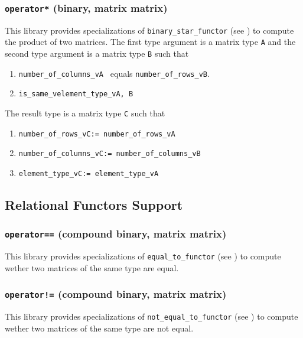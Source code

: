 \documentclass[oneside]{book}
\begin{document}
\subsubsection{\texttt{operator*} (binary, matrix matrix)}
This library provides specializations of
\texttt{binary\_star\_functor}
(see \cite{arithmeticfunctors}) to compute the
product
of two matrices. The first type argument is a matrix type \texttt{A} and the second type argument is a matrix type \texttt{B}
such that
\begin{enumerate}
	\item \texttt{number\_of\_columns\_v\textlangle A \textrangle} equals \texttt{number\_of\_rows\_v\textlangle B\textrangle}.
	\item \texttt{is\_same\_v\textlangle element\_type\_v\textlangle A, B\textrangle\textrangle}
\end{enumerate}
The result type is a matrix type \texttt{C} such that
\begin{enumerate}
	\item \texttt{number\_of\_rows\_v\textlangle C\textrangle := number\_of\_rows\_v\textlangle A\textrangle}
	\item \texttt{number\_of\_columns\_v\textlangle C\textrangle := number\_of\_columns\_v\textlangle B\textrangle}
	\item \texttt{element\_type\_v\textlangle C\textrangle := element\_type\_v\textlangle A\textrangle}
\end{enumerate}


\subsection{Relational Functors Support}

\subsubsection{\texttt{operator==} (compound binary, matrix matrix)}
This library provides specializations of
\texttt{equal\_to\_functor}
(see \cite{relationalfunctors}) to compute
wether two matrices of the same type are equal.

\subsubsection{\texttt{operator!=} (compound binary, matrix matrix)}
This library provides specializations of
\texttt{not\_equal\_to\_functor}
(see \cite{relationalfunctors}) to compute
wether two matrices of the same type are not equal.







\end{document}
